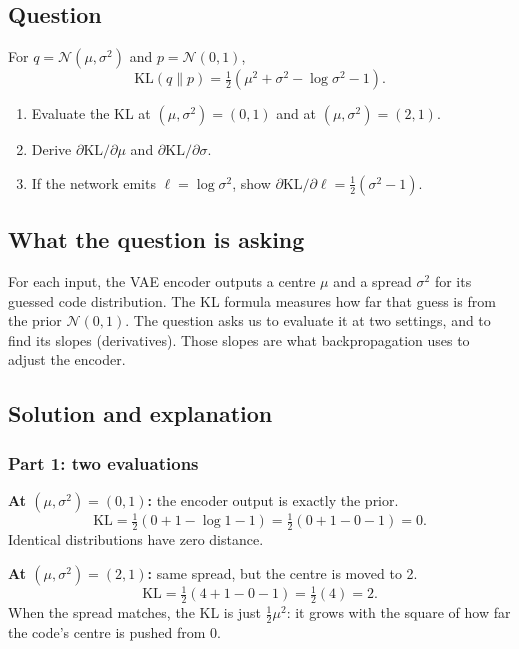 \documentclass[12pt,a4paper]{article}
\begin{document}
\subsection{Question}

For $q = \mathcal{N}(\mu, \sigma^2)$ and $p = \mathcal{N}(0, 1)$,
\[
\mathrm{KL}(q\|p) = \tfrac{1}{2}\left(\mu^2 + \sigma^2 - \log\sigma^2 - 1\right).
\]

\begin{enumerate}[leftmargin=*]
\item Evaluate the KL at $(\mu, \sigma^2) = (0, 1)$ and at $(\mu, \sigma^2) = (2, 1)$.
\item Derive $\partial \mathrm{KL}/\partial\mu$ and $\partial \mathrm{KL}/\partial\sigma$.
\item If the network emits $\ell = \log\sigma^2$, show $\partial \mathrm{KL}/\partial\ell = \tfrac{1}{2}(\sigma^2 - 1)$.
\end{enumerate}

\subsection{What the question is asking}

For each input, the VAE encoder outputs a centre $\mu$ and a spread $\sigma^2$ for its guessed code distribution. The KL formula measures how far that guess is from the prior $\mathcal{N}(0,1)$. The question asks us to evaluate it at two settings, and to find its slopes (derivatives). Those slopes are what backpropagation uses to adjust the encoder.

\subsection{Solution and explanation}

\subsubsection{Part 1: two evaluations}

\textbf{At $(\mu, \sigma^2) = (0, 1)$:} the encoder output is exactly the prior.
\[
\mathrm{KL} = \tfrac{1}{2}(0 + 1 - \log 1 - 1) = \tfrac{1}{2}(0 + 1 - 0 - 1) = 0.
\]
Identical distributions have zero distance.

\textbf{At $(\mu, \sigma^2) = (2, 1)$:} same spread, but the centre is moved to 2.
\[
\mathrm{KL} = \tfrac{1}{2}(4 + 1 - 0 - 1) = \tfrac{1}{2}(4) = 2.
\]
When the spread matches, the KL is just $\tfrac12\mu^2$: it grows with the square of how far the code's centre is pushed from 0.
\end{document}
